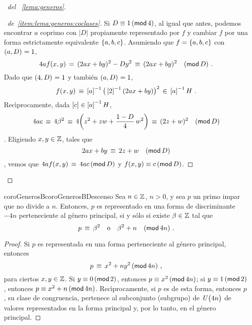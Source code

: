 \begin{proof}[\proofname~del \lemaname~\ref{lema:generos}]
\begin{proof}[\proofname~de~\ref{item:lema:generos:coclases}]
		Si $D\equiv 1\tmodulo[4]$, al igual que antes, podemos
		encontrar $a$ coprimo con $|D|$ propiamente representado
		por $f$ y cambiar $f$ por una forma estrictamente
		equivalente $\binaria{a,b,c}$. Asumiendo que
		$f=\binaria{a,b,c}$ con $\mcd{a,D}=1$,
		\begin{displaymath}
			4af(x,y)\,=\,(2ax+by)^2-Dy^2\,\equiv\,
				(2ax+by)^2\modulo[D]
			\dispstop
		\end{displaymath}
		Dado que $\mcd{4,D}=1$ y tambi\'en $\mcd{a,D}=1$,
		\begin{displaymath}
			f(x,y)\,\equiv\,\clase a^{-1}\big(
				\clase 2^{-1}(2ax+by)\big)^2
				\,\in\,\clase a^{-1}H
			\dispstop
		\end{displaymath}
		Rec\'{\i}procamente, dada $\clase c\in\clase a^{-1}H$,
		\begin{displaymath}
			4ac\,\equiv\,4\beta^2\,\equiv\,
				4\bigg(z^2+zw+\frac{1-D} 4\,w^2\bigg)
				\,\equiv\,(2z+w)^2\modulo[D]
		\end{displaymath}
		\quedacomoejercicio.
		Eligiendo $x,y\in\Enteros$, tales que
		\begin{displaymath}
			2ax+by\,\equiv\,2z+w\modulo[D]
		\end{displaymath}
		\quedacomoejercicio,
		vemos que $4af(x,y)\,\equiv\,4ac\tmodulo[D]$ y
		$f(x,y)\equiv c\tmodulo[D]$.
	\end{proof}
\end{proof}

\begin{restatable}{coroGenerosB}{coroGenerosBDescenso}
	\label{coro:generos:cero}
	Sea $n\in\Enteros$, $n>0$, y sea $p$ un primo impar que no
	divide a $n$. Entonces, $p$ es representado en una forma de
	discriminante $-4n$ perteneciente al g\'enero principal, si
	y s\'olo si existe $\beta\in\Enteros$ tal que
	\begin{displaymath}
		p\,\equiv\,\beta^2\dispor\beta^2+n\modulo[4n]
		\dispstop
	\end{displaymath}
\end{restatable}

\begin{proof}
	Si $p$ es representada en una forma perteneciente al g\'enero
	principal, entonces
	\begin{displaymath}
		p\,\equiv\,x^2+ny^2\tmodulo[4n]
		\dispcomma
	\end{displaymath}
	para ciertos $x,y\in\Enteros$.
	Si $y\equiv 0\tmodulo[2]$, entonces $p\equiv x^2\tmodulo[4n]$;
	si $y\equiv 1\tmodulo[2]$, entonces $p\equiv x^2+n\tmodulo[4n]$.
	Rec\'{\i}procamente, si $p$ es de esta forma, entonces $p$,
	su clase de congruencia, pertenece al subconjunto (subgrupo)
	de $\Unidadesmod[4n]$ de valores representados en la forma
	principal y, por lo tanto, en el g\'enero principal.
\end{proof}


